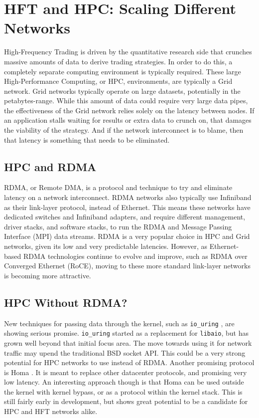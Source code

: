 \documentclass[letterpaper]{article}
\begin{document}
{{{\section{HFT and HPC: Scaling Different Networks}
High-Frequency Trading is driven by the quantitative research side that crunches massive amounts of data to derive trading strategies. In order to do this, a completely separate computing environment is typically required. These large High-Performance Computing, or HPC, environments, are typically a Grid network.
\newline
\newline
Grid networks typically operate on large datasets, potentially in the petabytes-range. While this amount of data could require very large data pipes, the effectiveness of the Grid network relies solely on the latency between nodes. If an application stalls waiting for results or extra data to crunch on, that damages the viability of the strategy. And if the network interconnect is to blame, then that latency is something that needs to be eliminated.

\subsection{HPC and RDMA}
RDMA, or Remote DMA, is a protocol and technique to try and eliminate latency on a network interconnect. RDMA networks also typically use Infiniband as their link-layer protocol, instead of Ethernet. This means these networks have dedicated switches and Infiniband adapters, and require different management, driver stacks, and software stacks, to run the RDMA and Message Passing Interface (MPI) data streams.
\newline
\newline
RDMA is a very popular choice in HPC and Grid networks, given its low and very predictable latencies. However, as Ethernet-based RDMA technologies continue to evolve and improve, such as RDMA over Converged Ethernet (RoCE), moving to these more standard link-layer networks is becoming more attractive.

\subsection{HPC Without RDMA?}
New techniques for passing data through the kernel, such as {\small \texttt{io\_uring}} \cite{iouring}, are showing serious promise. {\small \texttt{io\_uring}} started as a replacement for {\small \texttt{libaio}}, but has grown well beyond that initial focus area. The move towards using it for network traffic may upend the traditional BSD socket API. This could be a very strong potential for HPC networks to use instead of RDMA.
\newline
\newline
Another promising protocol is Homa \cite{homa}. It is meant to replace other datacenter protocols, and promising very low latency. An interesting approach though is that Homa can be used outside the kernel with kernel bypass, or as a protocol within the kernel stack.  This is still fairly early in development, but shows great potential to be a candidate for HPC and HFT networks alike.

}}}
\end{document}
